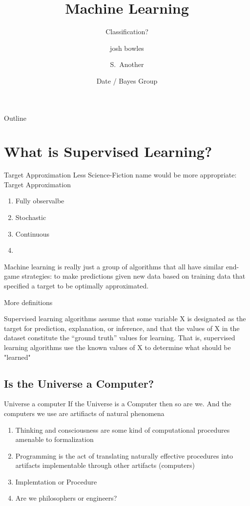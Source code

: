 \documentclass{beamer}
\title[Supervised Learning] %
{Machine Learning}
\subtitle
{Classification?} %
\author[josh bowles, Another] %
{josh bowles\inst{1} \and S.~Another\inst{2}}
\institute[Universities of Somewhere and Elsewhere] %
{
  \inst{1}%
  Department of Experimental Philosophy\\
  University of Somewhere
  \and
  \inst{2}%
  Department of Theoretical Philosophy\\
  University of Elsewhere}
\date[\Today] %
{Date / Bayes Group}
\begin{document}
\begin{frame}
  \titlepage
\end{frame}

\begin{frame}{Outline}
  \tableofcontents
\end{frame}

\section{What is Supervised Learning?}

\begin{frame}{Target Approximation}
  Less Science-Fiction name would be more appropriate: Target Approximation
  \begin{enumerate} According to Ai taxonomy
\item Fully observalbe
\item Stochastic
\item Continuous
\item 
  \end{enumerate}
Machine learning is really just a group of algorithms that all have similar end-game strategies: to make predictions given new data based on training data that specified a target to be optimally approximated.
\end{frame}

\begin{frame}{More definitions}
	\begin{block}
		Supervised learning algorithms assume that some variable X is designated as the target for prediction, explanation, or inference, and that the values of X in the dataset constitute the “ground truth” values for learning. That is, supervised learning algorithms use the known values of X to determine what should be "learned"
	\end{block}
  
\end{frame} 

\subsection{Is the Universe a Computer?}
\begin{frame}{Universe a computer}\label{universe}
If the Universe is a Computer then so are we. And the computers we use are artifiacts of natural phenomena
\begin{enumerate}
\item Thinking and consciousness are some kind of computational procedures amenable to formalization
\item Programming is the act of translating naturally effective procedures into artifacts implementable through other artifacts (computers)
\item Implemtation or Procedure
\item Are we philosophers or engineers?
\end{enumerate}
\end{frame}
\end{document}
